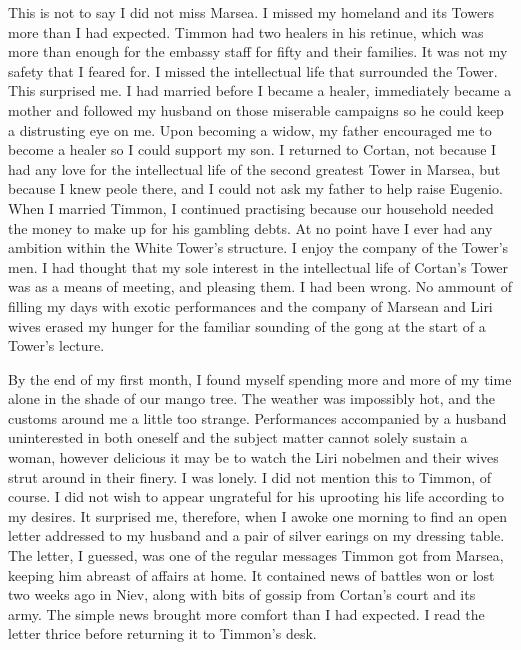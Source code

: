 \documentclass{article}
\begin{document}
This is not to say I did not miss Marsea. I missed my homeland and its Towers  more than I had expected. Timmon had two healers in his retinue, which was more than enough for the embassy staff for fifty and their families. It was not my safety that I feared for. I missed the intellectual life that surrounded the Tower. This surprised me. I had married before I became a healer, immediately became a mother and followed my husband on those miserable campaigns so he could keep a distrusting eye on me. Upon becoming a widow, my father encouraged me to become a healer so I could support my son. I returned to Cortan, not because I had any love for the intellectual life of the second greatest Tower in Marsea, but because I knew peole there, and I could not ask my father to help raise Eugenio. When I married Timmon, I continued practising because our household needed the money to make up for his gambling debts. At no point have I ever had any ambition within the White Tower's structure. I enjoy the company of the Tower's men. I had thought that my sole interest in the intellectual life of Cortan's Tower was as a means of meeting, and pleasing them. I had been wrong. No ammount of filling my days with exotic performances and the company of Marsean and Liri wives erased my hunger for the familiar sounding of the gong at the start of a Tower's lecture.

By the end of my first month, I found myself spending more and more of my time alone in the shade of our mango tree. The weather was impossibly hot, and the customs around me a little too strange. Performances accompanied by a husband uninterested in both oneself and the subject matter cannot solely sustain a woman, however delicious it may be to watch the Liri nobelmen and their wives strut around in their finery. I was lonely. I did not mention this to Timmon, of course. I did not wish to appear ungrateful for his uprooting his life according to my desires. It surprised me, therefore, when I awoke one morning to find an open letter addressed to my husband and a pair of silver earings on my dressing table. The letter, I guessed, was one of the regular messages Timmon got from Marsea, keeping him abreast of affairs at home. It contained news of battles won or lost two weeks ago in Niev, along with bits of gossip from Cortan's court and its army. The simple news brought more comfort than I had expected. I read the letter thrice before returning it to Timmon's desk. 
\end{document}

